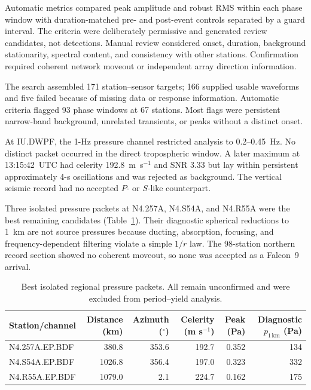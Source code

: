 \documentclass[]{seismica}
\begin{document}
Automatic metrics compared peak amplitude and robust RMS within each phase
window with duration-matched pre- and post-event controls separated by a guard
interval. The criteria were deliberately permissive and generated review
candidates, not detections. Manual review considered onset, duration,
background stationarity, spectral content, and consistency with other
stations. Confirmation required coherent network moveout or independent array
direction information.

The search assembled 171 station--sensor targets; 166 supplied usable
waveforms and five failed because of missing data or response information.
Automatic criteria flagged 93 phase windows at 67 stations. Most flags were
persistent narrow-band background, unrelated transients, or peaks without a
distinct onset.

At IU.DWPF, the 1-Hz pressure channel restricted analysis to 0.2--0.45~Hz. No
distinct packet occurred in the direct tropospheric window. A later maximum at
13:15:42~UTC had celerity 192.8~m~s$^{-1}$ and SNR 3.33 but lay within
persistent approximately 4-s oscillations and was rejected as background. The
vertical seismic record had no accepted $P$- or $S$-like counterpart.

Three isolated pressure packets at N4.257A, N4.S54A, and N4.R55A were the best
remaining candidates (Table~\ref{tab:supp_regional_candidates}). Their
diagnostic spherical reductions to 1~km are not source pressures because
ducting, absorption, focusing, and frequency-dependent filtering violate a
simple $1/r$ law. The 98-station northern record section showed no coherent
moveout, so none was accepted as a Falcon~9 arrival.

\begin{table}[!tbp]
\centering
\caption{Best isolated regional pressure packets. All remain unconfirmed and
were excluded from period--yield analysis.}
\label{tab:supp_regional_candidates}
\begin{tabular}{lrrrrr}
\hline
Station/channel & Distance (km) & Azimuth ($^\circ$) & Celerity (m s$^{-1}$) & Peak (Pa) & Diagnostic $p_{1\,\mathrm{km}}$ (Pa) \\
\hline
N4.257A.EP.BDF & 380.8 & 353.6 & 192.7 & 0.352 & 134 \\
N4.S54A.EP.BDF & 1026.8 & 356.4 & 197.0 & 0.323 & 332 \\
N4.R55A.EP.BDF & 1079.0 & 2.1 & 224.7 & 0.162 & 175 \\
\hline
\end{tabular}
\end{table}
\end{document}
